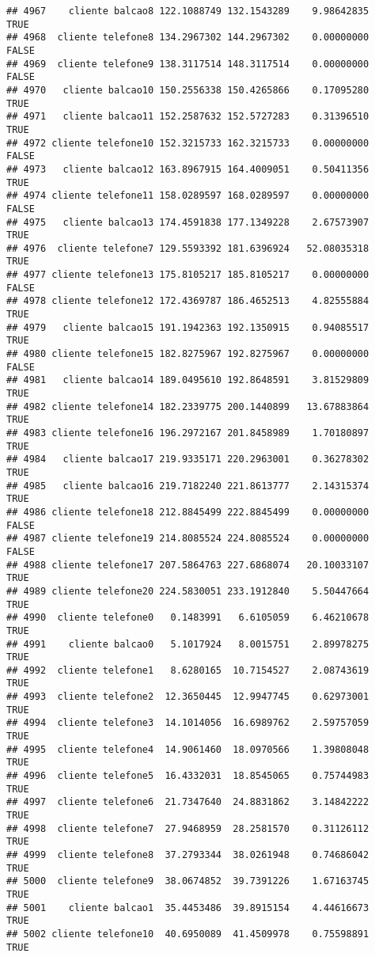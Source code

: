 \documentclass[
]{article}
\begin{document}
\begin{verbatim}
## 4967    cliente balcao8 122.1088749 132.1543289    9.98642835     TRUE
## 4968  cliente telefone8 134.2967302 144.2967302    0.00000000    FALSE
## 4969  cliente telefone9 138.3117514 148.3117514    0.00000000    FALSE
## 4970   cliente balcao10 150.2556338 150.4265866    0.17095280     TRUE
## 4971   cliente balcao11 152.2587632 152.5727283    0.31396510     TRUE
## 4972 cliente telefone10 152.3215733 162.3215733    0.00000000    FALSE
## 4973   cliente balcao12 163.8967915 164.4009051    0.50411356     TRUE
## 4974 cliente telefone11 158.0289597 168.0289597    0.00000000    FALSE
## 4975   cliente balcao13 174.4591838 177.1349228    2.67573907     TRUE
## 4976  cliente telefone7 129.5593392 181.6396924   52.08035318     TRUE
## 4977 cliente telefone13 175.8105217 185.8105217    0.00000000    FALSE
## 4978 cliente telefone12 172.4369787 186.4652513    4.82555884     TRUE
## 4979   cliente balcao15 191.1942363 192.1350915    0.94085517     TRUE
## 4980 cliente telefone15 182.8275967 192.8275967    0.00000000    FALSE
## 4981   cliente balcao14 189.0495610 192.8648591    3.81529809     TRUE
## 4982 cliente telefone14 182.2339775 200.1440899   13.67883864     TRUE
## 4983 cliente telefone16 196.2972167 201.8458989    1.70180897     TRUE
## 4984   cliente balcao17 219.9335171 220.2963001    0.36278302     TRUE
## 4985   cliente balcao16 219.7182240 221.8613777    2.14315374     TRUE
## 4986 cliente telefone18 212.8845499 222.8845499    0.00000000    FALSE
## 4987 cliente telefone19 214.8085524 224.8085524    0.00000000    FALSE
## 4988 cliente telefone17 207.5864763 227.6868074   20.10033107     TRUE
## 4989 cliente telefone20 224.5830051 233.1912840    5.50447664     TRUE
## 4990  cliente telefone0   0.1483991   6.6105059    6.46210678     TRUE
## 4991    cliente balcao0   5.1017924   8.0015751    2.89978275     TRUE
## 4992  cliente telefone1   8.6280165  10.7154527    2.08743619     TRUE
## 4993  cliente telefone2  12.3650445  12.9947745    0.62973001     TRUE
## 4994  cliente telefone3  14.1014056  16.6989762    2.59757059     TRUE
## 4995  cliente telefone4  14.9061460  18.0970566    1.39808048     TRUE
## 4996  cliente telefone5  16.4332031  18.8545065    0.75744983     TRUE
## 4997  cliente telefone6  21.7347640  24.8831862    3.14842222     TRUE
## 4998  cliente telefone7  27.9468959  28.2581570    0.31126112     TRUE
## 4999  cliente telefone8  37.2793344  38.0261948    0.74686042     TRUE
## 5000  cliente telefone9  38.0674852  39.7391226    1.67163745     TRUE
## 5001    cliente balcao1  35.4453486  39.8915154    4.44616673     TRUE
## 5002 cliente telefone10  40.6950089  41.4509978    0.75598891     TRUE

\end{verbatim}
\end{document}
